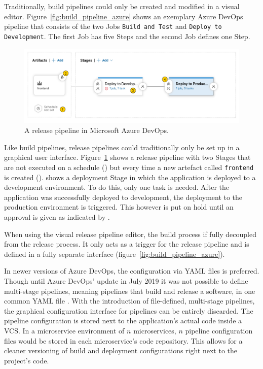Traditionally, build pipelines could only be created and modified in a visual
editor. Figure~\ref{fig:build_pipeline_azure} shows an exemplary Azure DevOps
pipeline that consists of the two Jobs \texttt{Build and Test} and
\texttt{Deploy to Development}. The first Job has five Steps and the second Job
defines one Step.

\begin{figure}[H]
\begin{center}
  \includegraphics[scale=0.5]{images/figures/azure_devops_release_pipeline_base.pdf}
\end{center}
\caption{A release pipeline in Microsoft Azure DevOps.}%
\label{fig:release_pipeline_azure}
\end{figure}

Like build pipelines, release pipelines could traditionally only be set up in a
graphical user interface. Figure~\ref{fig:release_pipeline_azure} shows a
release pipeline with two Stages that are not executed on a schedule
() but every time a new artefact called \texttt{frontend} is created
().  shows a deployment Stage in which the application is
deployed to a development environment. To do this, only one task is needed.
After the application was successfully deployed to development, the deployment
to the production environment is triggered. This however is put on hold until
an approval is given as indicated by .

When using the visual release pipeline editor, the build process if fully
decoupled from the release process. It only acts as a trigger for the release
pipeline and is defined in a fully separate interface
(figure~\ref{fig:build_pipeline_azure}).

In newer versions of Azure DevOps, the configuration via YAML files is
preferred. Though until Azure DevOps' update in July 2019 it was not possible
to define multi-stage pipelines, meaning pipelines that build and release a
software, in one common YAML file
\autocite{GuckenheimerNewAnalyticsreports2019}. With the introduction of
file-defined, multi-stage pipelines, the graphical configuration interface for
pipelines can be entirely discarded. The pipeline configuration is stored next
to the application's actual code inside a \ac{VCS}. In a microservice
environment of $n$ microservices, $n$ pipeline configuration files would be
stored in each microservice's code repository. This allows for a cleaner
versioning of build and deployment configurations right next to the project's
code.

